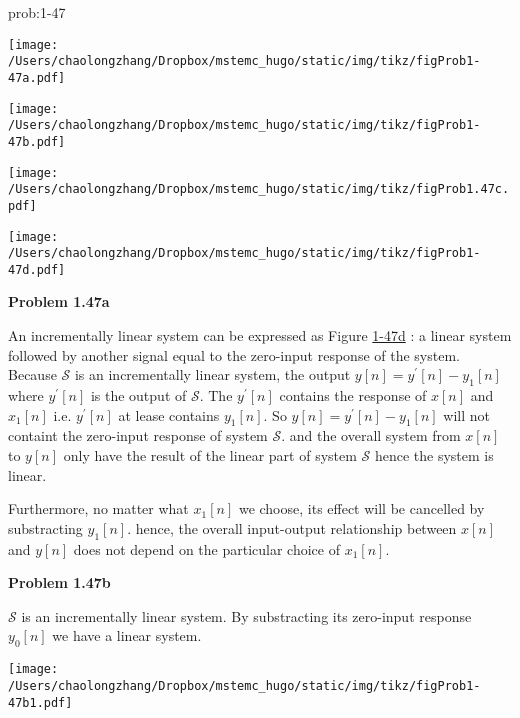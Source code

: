 \documentclass[koma,a4paper,utopia,12pt,listings-color,microtype,paralist,colorlinks,urlcolor=red]{org-article}
\begin{document}
\begin{prob}[]{prob:1-47}
\begin{center}
\texttt{[image: /Users/chaolongzhang/Dropbox/mstemc\_hugo/static/img/tikz/figProb1-47a.pdf]}
\label{figProb1-47a}
\end{center}

\begin{center}
\texttt{[image: /Users/chaolongzhang/Dropbox/mstemc\_hugo/static/img/tikz/figProb1-47b.pdf]}
\label{figProb1-47b}
\end{center}

\begin{center}
\texttt{[image: /Users/chaolongzhang/Dropbox/mstemc\_hugo/static/img/tikz/figProb1.47c.pdf]}
\label{figProb1-47c}
\end{center}

\begin{center}
\texttt{[image: /Users/chaolongzhang/Dropbox/mstemc\_hugo/static/img/tikz/figProb1-47d.pdf]}
\label{figProb1-47d}
\end{center}
\label{prob:1-47}
\end{prob}

\textbf{Problem 1.47a}

An incrementally linear system can be expressed as Figure \hyperref[figProb1-47d]{1-47d} : a linear
system followed by another signal equal to the zero-input response of the
system. Because \(\mathcal{S}\) is an incrementally linear system, the output
\(y[n] = y^{'}[n] - y_{1}[n]\) where \(y^{'}[n]\) is the output of
\(\mathcal{S}\). The \(y^{'}[n]\) contains the response of \(x[n]\) and
\(x_{1}[n]\) i.e. \(y^{'}[n]\) at lease contains \(y_{1}[n]\). So \(y[n] =
y^{'}[n] - y_{1}[n]\) will not containt the zero-input response of system
\(\mathcal{S}\). and the overall system from \(x[n]\) to \(y[n]\) only have the
result of the linear part of system \(\mathcal{S}\) hence the system is linear.

Furthermore, no matter what \(x_{1}[n]\) we choose, its effect will be cancelled
by substracting \(y_{1}[n]\). hence, the overall input-output relationship
between \(x[n]\) and \(y[n]\) does not depend on the particular choice of \(x_{1}[n]\).

\textbf{Problem 1.47b}

\(\mathcal{S}\) is an incrementally linear system. By substracting its
zero-input response \(y_{0}[n]\) we have a linear system.

\begin{center}
\texttt{[image: /Users/chaolongzhang/Dropbox/mstemc\_hugo/static/img/tikz/figProb1-47b1.pdf]}
\end{center}
\end{document}
